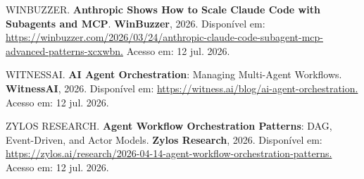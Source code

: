 \documentclass[12pt,a4paper]{article}
\begin{document}
WINBUZZER. \textbf{Anthropic Shows How to Scale Claude Code with Subagents and MCP}. \textbf{WinBuzzer}, 2026. Disponível em: \url{https://winbuzzer.com/2026/03/24/anthropic-claude-code-subagent-mcp-advanced-patterns-xcxwbn.} Acesso em: 12 jul. 2026.

WITNESSAI. \textbf{AI Agent Orchestration}: Managing Multi-Agent Workflows. \textbf{WitnessAI}, 2026. Disponível em: \url{https://witness.ai/blog/ai-agent-orchestration.} Acesso em: 12 jul. 2026.

ZYLOS RESEARCH. \textbf{Agent Workflow Orchestration Patterns}: DAG, Event-Driven, and Actor Models. \textbf{Zylos Research}, 2026. Disponível em: \url{https://zylos.ai/research/2026-04-14-agent-workflow-orchestration-patterns.} Acesso em: 12 jul. 2026.
\end{document}
